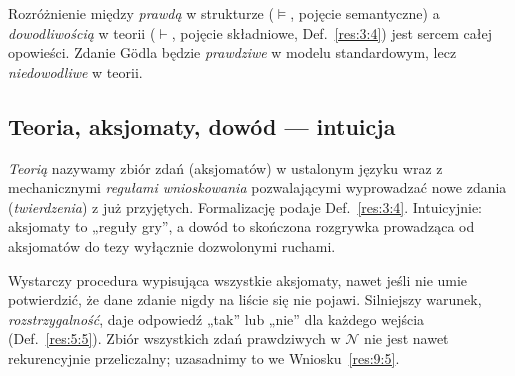 \begin{uwaga}\label{res:2:16}
Rozróżnienie między \emph{prawdą} w strukturze ($\models$, pojęcie semantyczne) a \emph{dowodliwością} w teorii ($\vdash$, pojęcie składniowe, Def.~\ref{res:3:4}) jest sercem całej opowieści. Zdanie Gödla będzie \emph{prawdziwe} w modelu standardowym, lecz \emph{niedowodliwe} w teorii.
\end{uwaga}

\subsection*{Teoria, aksjomaty, dowód --- intuicja}\label{sec:teoria-dowod-intuicja}
\begin{definicja}\label{res:2:17}
\emph{Teorią} nazywamy zbiór zdań (aksjomatów) w ustalonym języku wraz z mechanicznymi \emph{regułami wnioskowania} pozwalającymi wyprowadzać nowe zdania (\emph{twierdzenia}) z już przyjętych. Formalizację podaje Def.~\ref{res:3:4}. Intuicyjnie: aksjomaty to „reguły gry”, a dowód to skończona rozgrywka prowadząca od aksjomatów do tezy wyłącznie dozwolonymi ruchami.
\end{definicja}

\begin{uwaga}\label{res:2:18}
Wystarczy procedura wypisująca wszystkie aksjomaty, nawet jeśli nie umie potwierdzić, że dane zdanie nigdy na liście się nie pojawi. Silniejszy warunek, \emph{rozstrzygalność}, daje odpowiedź „tak” lub „nie” dla każdego wejścia (Def.~\ref{res:5:5}). Zbiór wszystkich zdań prawdziwych w $\mathcal N$ nie jest nawet rekurencyjnie przeliczalny; uzasadnimy to we Wniosku~\ref{res:9:5}.
\end{uwaga}

